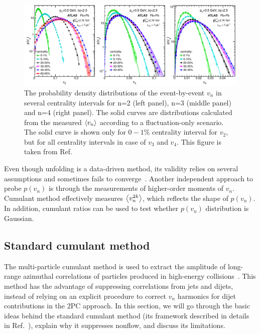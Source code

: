 \begin{figure}[H]
\centering
\includegraphics[width=.95\linewidth]{figs/chapter_subcumu/ebye_vn.pdf}
\caption{The probability density distributions of the event-by-event $v_n$ in several centrality intervals for n=2 (left panel), n=3 (middle panel) and n=4 (right panel). The solid curves are distributions calculated from the measured $\left\langle v_n\right\rangle$ according to a fluctuation-only scenario. The solid curve is shown only for $0-1\%$ centrality interval for $v_2$, but for all centrality intervals in case of $v_3$ and $v_4$. This figure is taken from Ref.~\cite{Aad:2013xma}}
\label{fig:subcumu_ebye_vn}
\end{figure}

Even though unfolding is a data-driven method, its validity relies on several assumptions and sometimes fails to converge~\cite{Aad:2013xma}. Another independent approach to probe $p(v_n)$ is through the measurements of higher-order moments of $v_n$. Cumulant method effectively measures $\left\langle v_n^{2k}\right\rangle$, which reflects the shape of $p(v_n)$. In addition, cumulant ratios can be used to test whether $p(v_n)$ distribution is Gaussian.



\subsection{Standard cumulant method}

The multi-particle cumulant method is used to extract the amplitude of long-range azimuthal correlations of particles produced in high-energy collisions~\cite{Borghini:2000sa}. This method has the advantage of suppressing correlations from jets and dijets, instead of relying on an explicit procedure to correct $v_n$ harmonics for dijet contributions in the 2PC approach. In this section, we will go through the basic ideas behind the standard cumulant method (its framework described in details in Ref.~\cite{Bilandzic:2010jr, Bilandzic:2013kga}), explain why it suppresses nonflow, and discuss its limitations.



